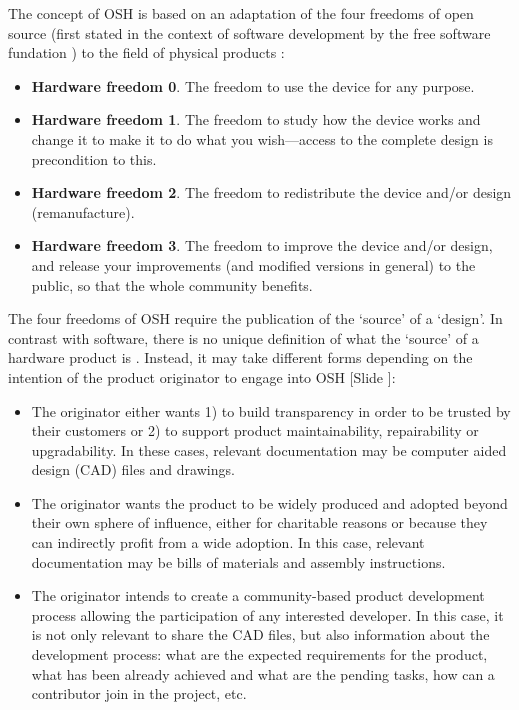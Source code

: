 \documentclass{article}
\newcounter{slide}
\begin{document}
The concept of OSH is based on an adaptation of the four freedoms of open source (first stated in the context of software development by the free software fundation \cite{freesoftwarefoundationFreeSoftwareDefinition2015}) to the field of physical products \cite{powellDemocratizingProductionOpen2012}: 
\begin{itemize}
	\item \textbf{Hardware freedom 0}. The freedom to use the device for any purpose.
	\item \textbf{Hardware freedom 1}. The freedom to study how the device works and change it to make it to do what you wish---access to the complete design is precondition to this.
	\item \textbf{Hardware freedom 2}. The freedom to redistribute the device and/or design (remanufacture).
	\item \textbf{Hardware freedom 3}. The freedom to improve the device and/or design, and release your improvements (and modified versions in general) to the public, so that the whole community benefits.
\end{itemize}

The four freedoms of OSH require the publication of the `source' of a `design'. In contrast with software, there is no unique definition of what the `source' of a hardware product is \cite{bonvoisinWhatSourceOpen2017}. Instead, it may take different forms depending on the intention of the product originator to engage into OSH {\color{blue}[Slide ]}:
\begin{itemize}
  \item The originator either wants 1) to build transparency in order to be trusted by their customers or 2) to support product maintainability, repairability or upgradability. In these cases, relevant documentation may be computer aided design (CAD) files and drawings.
  \item The originator wants the product to be widely produced and adopted beyond their own sphere of influence, either for charitable reasons or because they can indirectly profit from a wide adoption. In this case, relevant documentation may be bills of materials and assembly instructions.
  \item The originator intends to create a community-based product development process allowing the participation of any interested developer. In this case, it is not only relevant to share the CAD files, but also information about the development process: what are the expected requirements for the product, what has been already achieved and what are the pending tasks, how can a contributor join in the project, etc.
\end{itemize}
\end{document}
